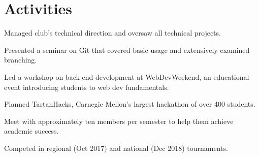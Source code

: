\documentclass[]{openfont}
\begin{document}
\begin{minipage}[t]{0.60\textwidth}
\sectionsep


\section{Activities} 
\begin{tightemize}
    \item Managed club's technical direction and oversaw all technical projects.
    \item Presented a seminar on Git that covered basic usage and extensively
        examined branching.
    \item Led a workshop on back-end development at WebDevWeekend, an
        educational event introducing students to web dev fundamentals.
    \item Planned TartanHacks, Carnegie Mellon's largest hackathon of over 400
        students.
\end{tightemize}

\sectionsep

\begin{tightemize}
    \item Meet with approximately ten members per semester to help them achieve
        academic success.
\end{tightemize}

\sectionsep

\begin{tightemize}
    \item Competed in regional (Oct 2017) and national (Dec 2018) tournaments.
\end{tightemize}

\sectionsep

\end{minipage} 
\end{document}
